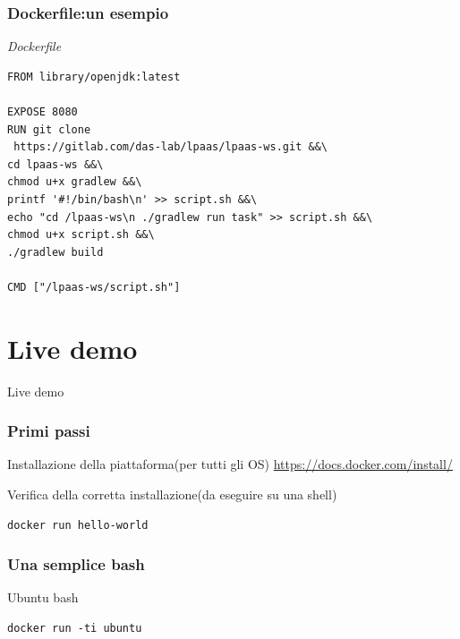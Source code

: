 \documentclass{beamer}
\begin{document}
\begin{frame}[fragile] %
\frametitle{Dockerfile:un esempio}
\begin{block}{\textit{Dockerfile}}
\begin{verbatim}
FROM library/openjdk:latest

EXPOSE 8080
RUN git clone
 https://gitlab.com/das-lab/lpaas/lpaas-ws.git &&\
cd lpaas-ws &&\
chmod u+x gradlew &&\
printf '#!/bin/bash\n' >> script.sh &&\
echo "cd /lpaas-ws\n ./gradlew run task" >> script.sh &&\
chmod u+x script.sh &&\
./gradlew build

CMD ["/lpaas-ws/script.sh"]
\end{verbatim}
\end{block}
\end{frame}

\section{Live demo}
\begin{frame}
\Huge{\centerline{Live demo}}
\end{frame}

\begin{frame}[fragile]
\frametitle{Primi passi}

\begin{block}{Installazione della piattaforma(per tutti gli OS)}
\href{https://docs.docker.com/install}{https://docs.docker.com/install/}
\end{block}

\begin{block}{Verifica della corretta installazione(da eseguire su una shell)}
\begin{verbatim}
docker run hello-world
\end{verbatim}
\end{block}
\end{frame}
\begin{frame}[fragile]
\frametitle{Una semplice bash}
\begin{block}{Ubuntu bash}
\begin{verbatim}
docker run -ti ubuntu
\end{verbatim}
\end{block}
\end{frame}
\end{document}
